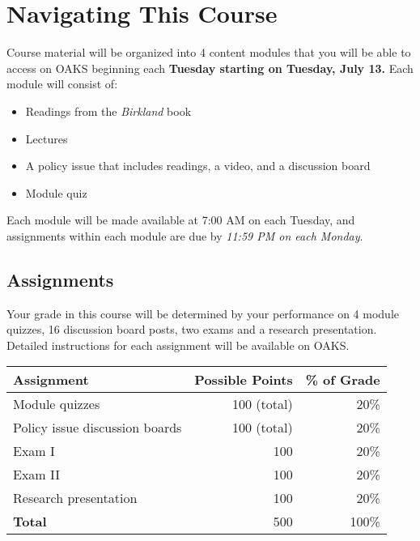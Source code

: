 \hypertarget{navigating-this-course}{%
\section{Navigating This Course}\label{navigating-this-course}}

Course material will be organized into 4 content modules that you will
be able to access on OAKS beginning each \textbf{Tuesday starting on
Tuesday, July 13.} Each module will consist of:

\begin{itemize}
\item
  Readings from the \emph{Birkland} book
\item
  Lectures
\item
  A policy issue that includes readings, a video, and a discussion board
\item
  Module quiz
\end{itemize}

\vspace{0.1in}

\noindent Each module will be made available at 7:00 AM on each Tuesday,
and assignments within each module are due by \emph{11:59 PM on each
Monday}.

\hypertarget{assignments}{%
\subsection{Assignments}\label{assignments}}

Your grade in this course will be determined by your performance on 4
module quizzes, 16 discussion board posts, two exams and a research
presentation. Detailed instructions for each assignment will be
available on OAKS.

\vspace{0.15in}

\begin{tabular}{l | r | r}
\hline
Assignment & Possible Points & \% of Grade \\
\hline
Module quizzes & 100 (total) & 20\%  \\
Policy issue discussion boards & 100 (total) & 20\%  \\
Exam I & 100 & 20\% \\
Exam II & 100 & 20\% \\
Research presentation & 100 &  20\% \\  
\hline
\textbf{Total} & 500 & 100\% \\
\hline
\end{tabular}


